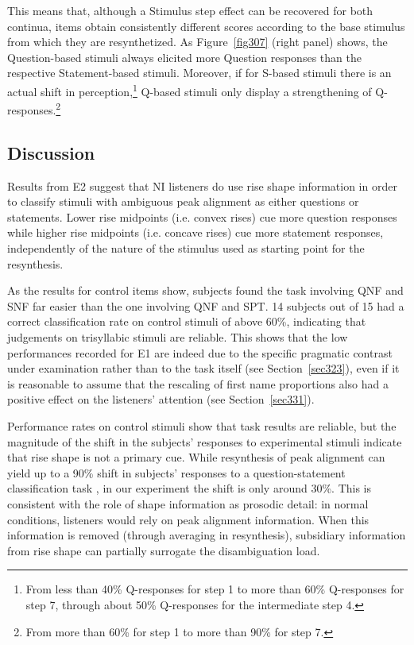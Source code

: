 \enlargethispage{\baselineskip}
This means that, although a Stimulus step effect can be recovered for both continua, items obtain consistently different scores according to the base stimulus from which they are resynthetized. As Figure~\ref{fig307} (right panel) shows, the Question-based stimuli always elicited more Question responses than the respective Statement-based stimuli. Moreover, if for S-based stimuli there is an actual shift in perception,\footnote{From less than 40\% Q-responses for step 1 to more than 60\% Q-responses for step 7, through about 50\% Q-responses for the intermediate step 4.} Q-based stimuli only display a strengthening of Q-responses.\footnote{From more than 60\% for step 1 to more than 90\% for step 7.}

\subsection{Discussion}\label{sec333}

Results from E2 suggest that NI listeners do use rise shape information in order to classify stimuli with ambiguous peak alignment as either questions or statements. Lower rise midpoints (i.e. convex rises) cue more question responses while higher rise midpoints (i.e. concave rises) cue more statement responses, independently of the nature of the stimulus used as starting point for the resynthesis.

As the results for control items show, subjects found the task involving QNF and SNF far easier than the one involving QNF and SPT. 14 subjects out of 15 had a correct classification rate on control stimuli of above 60\%, indicating that judgements on trisyllabic stimuli are reliable. This shows that the low performances recorded for E1 are indeed due to the specific pragmatic contrast under examination rather than to the task itself (see Section~\ref{sec323}), even if it is reasonable to assume that the rescaling of first name proportions also had a positive effect on the listeners' attention (see Section~\ref{sec331}).

Performance rates on control stimuli show that task results are reliable, but the magnitude of the shift in the subjects' responses to experimental stimuli indicate that rise shape is not a primary cue. While resynthesis of peak alignment can yield up to a 90\% shift in subjects' responses to a question-statement classification task \citep[§3, among others]{dimperio2000role}, in our experiment the shift is only around 30\%. This is consistent with the role of shape information as prosodic detail: in normal conditions, listeners would rely on peak alignment information. When this information is removed (through averaging in resynthesis), subsidiary information from rise shape can partially surrogate the disambiguation load.

